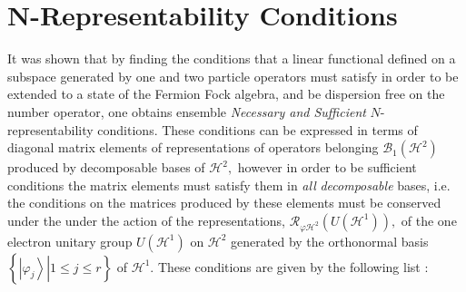 \documentclass[aps,preprint]{revtex4}%
\begin{document}
\section{N-Representability Conditions \label{NREP_Con}}

It was shown \cite{Weiner 2011} that by finding the conditions that a linear
functional defined on a subspace generated by one and two particle operators
must satisfy in order to be extended to a state of the Fermion Fock algebra,
and be dispersion free on the number operator, one obtains ensemble
\emph{Necessary and Sufficient }$N$-representability conditions. These
conditions can be expressed in terms of diagonal matrix elements of
representations of operators belonging $\mathcal{B}_{1}\left(  \mathcal{H}%
^{2}\right)  $ produced by decomposable bases of $\mathcal{H}^{2},$ however in
order to be sufficient conditions the matrix elements must satisfy them in
\emph{all} \emph{decomposable} bases, i.e. the conditions on the matrices
produced by these elements must be conserved under the under the action of the
representations, $\mathcal{R}_{\varphi\mathcal{H}^{2}}\left(  U\left(
\mathcal{H}^{1}\right)  \right)  ,$ of the one electron unitary group
$U\left(  \mathcal{H}^{1}\right)  $ on $\mathcal{H}^{2}$ generated by the
orthonormal basis $\left\{  \left.  \left\vert \varphi_{j}\right\rangle
\right\vert 1\leq j\leq r\right\}  $ of $\mathcal{H}^{1}.$ These conditions
are given by the following list :
\end{document}
